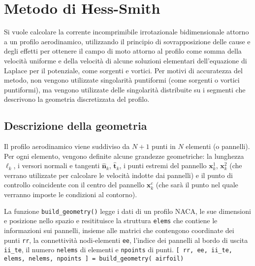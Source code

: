 \section{Metodo di Hess-Smith}

Si vuole calcolare la corrente incomprimibile irrotazionale bidimensionale attorno a un profilo aerodinamico, utilizzando il principio di sovrapposizione delle cause e degli effetti per ottenere il campo di moto attorno al profilo come somma della velocità uniforme e della velocità di alcune soluzioni elementari dell'equazione di Laplace per il potenziale, come sorgenti e vortici.\newline
Per motivi di accuratezza del metodo, non vengono utilizzate singolarità puntiformi (come sorgenti o vortici puntiformi), ma vengono utilizzate delle singolarità distribuite su i segmenti che descrivono la geometria discretizzata del profilo.

\subsection{Descrizione della geometria}
Il profilo aerodinamico viene suddiviso da $N+1$ punti in $N$ elementi (o pannelli).
Per ogni elemento, vengono definite alcune grandezze geometriche: la lunghezza $\ell_k$, i versori normali e tangenti $\bm{\hat{n}}_k$, $\bm{\hat{t}}_k$, i punti estremi del pannello $\bm{x}^1_k$, $\bm{x}^2_k$ (che verrano utilizzate per calcolare le velocità indotte dai pannelli) e il punto di controllo coincidente con il centro del pannello $\bm{x}^c_k$ (che sarà il punto nel quale verranno imposte le condizioni al contorno).

\begin{tcolorbox}
La funzione \texttt{build\_geometry()} legge i dati di un profilo NACA, le sue dimensioni e posizione nello spazio e resitituisce la struttura \texttt{elems} che contiene le informazioni sui pannelli, insieme alle matrici che contengono coordinate dei punti \texttt{rr}, la connettività nodi-elementi \texttt{ee}, l'indice dei pannelli al bordo di uscita \texttt{ii\_te}, il numero \texttt{nelems} di elementi e \texttt{npoints} di punti. \newline
\texttt{[ rr, ee, ii\_te, elems, nelems, npoints ] = build\_geometry( airfoil) }
\end{tcolorbox}

